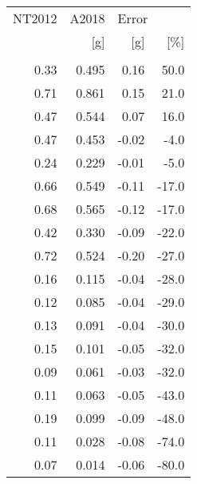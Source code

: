 \begin{tabular}{rrrr}
\toprule
NT2012 &  A2018 & \multicolumn{2}{l}{Error} \\
   [g] &    [g] &   [g] &   [\%] \\
       &        &       &       \\
\midrule
  0.33 &  0.495 &  0.16 &  50.0 \\
  0.71 &  0.861 &  0.15 &  21.0 \\
  0.47 &  0.544 &  0.07 &  16.0 \\
  0.47 &  0.453 & -0.02 &  -4.0 \\
  0.24 &  0.229 & -0.01 &  -5.0 \\
  0.66 &  0.549 & -0.11 & -17.0 \\
  0.68 &  0.565 & -0.12 & -17.0 \\
  0.42 &  0.330 & -0.09 & -22.0 \\
  0.72 &  0.524 & -0.20 & -27.0 \\
  0.16 &  0.115 & -0.04 & -28.0 \\
  0.12 &  0.085 & -0.04 & -29.0 \\
  0.13 &  0.091 & -0.04 & -30.0 \\
  0.15 &  0.101 & -0.05 & -32.0 \\
  0.09 &  0.061 & -0.03 & -32.0 \\
  0.11 &  0.063 & -0.05 & -43.0 \\
  0.19 &  0.099 & -0.09 & -48.0 \\
  0.11 &  0.028 & -0.08 & -74.0 \\
  0.07 &  0.014 & -0.06 & -80.0 \\
\bottomrule
\end{tabular}
